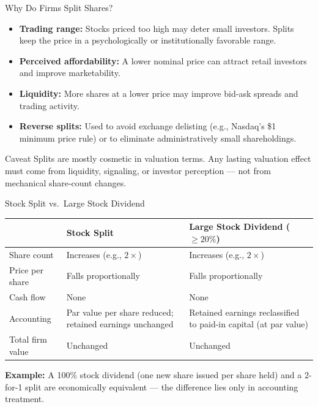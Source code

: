 \begin{frame}{Why Do Firms Split Shares?}
\begin{itemize}
    \item \textbf{Trading range:} Stocks priced too high may deter small investors. Splits keep the price in a psychologically or institutionally favorable range.

    \item \textbf{Perceived affordability:} A lower nominal price can attract retail investors and improve marketability.

    \item \textbf{Liquidity:} More shares at a lower price may improve bid-ask spreads and trading activity.

    \item \textbf{Reverse splits:} Used to avoid exchange delisting (e.g., Nasdaq's \$1 minimum price rule) or to eliminate administratively small shareholdings.
\end{itemize}

\vspace{3mm}
\begin{alertblock}{Caveat}
Splits are mostly cosmetic in valuation terms. Any lasting valuation effect must come from liquidity, signaling, or investor perception --- not from mechanical share-count changes.
\end{alertblock}
\end{frame}

\begin{frame}[t]{Stock Split vs.\ Large Stock Dividend}
\small
\begin{center}
\begin{tabular}{@{} l >{\raggedright\arraybackslash}p{3.6cm} >{\raggedright\arraybackslash}p{3.6cm} @{}}
\toprule
 & \textbf{Stock Split} & \textbf{Large Stock Dividend ($\geq 20\%$)} \\
\midrule
Share count      & Increases (e.g., $2\times$)  & Increases (e.g., $2\times$)  \\[2pt]
Price per share  & Falls proportionally          & Falls proportionally          \\[2pt]
Cash flow        & None                          & None                          \\[2pt]
Accounting       & Par value per share reduced; retained earnings unchanged & Retained earnings reclassified to paid-in capital (at par value) \\[2pt]
Total firm value & Unchanged                     & Unchanged                     \\
\bottomrule
\end{tabular}
\end{center}

\vspace{3mm}
\footnotesize \textbf{Example:} A 100\% stock dividend (one new share issued per share held) and a 2-for-1 split are economically equivalent --- the difference lies only in accounting treatment.
\end{frame}

